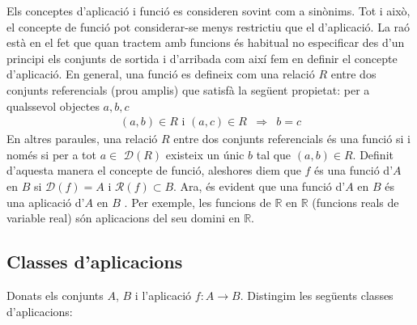 \begin{observacio}
Els conceptes d'aplicació i funció es consideren sovint com a sinònims. Tot i això, el concepte de funció pot considerar-se menys
restrictiu que el d'aplicació. La raó està en el fet que quan
tractem amb funcions és habitual no especificar des d'un principi els
conjunts de sortida i d'arribada com així fem en definir el concepte
d'aplicació. En general, una funció es defineix com una relació
$R$ entre dos conjunts referencials (prou amplis) que satisfà la següent propietat: per a qualssevol objectes $a,b,c$%
\begin{equation*}
\begin{array}{ccc}
(a,b)\in R\text{ i }(a,c)\in R & \Longrightarrow & b=c%
\end{array}
\end{equation*}
En altres paraules, una relació $R$ entre dos conjunts referencials és una funció si i només si per a tot $a\in$ $\mathcal{D}(R)$
existeix un únic $b$ tal que $(a,b)\in R$. Definit d'aquesta manera el
concepte de funció, aleshores diem que $f$ és una funció d'$A$
en $B$ si $\mathcal{D}(f)=A$ i $\mathcal{R}(f)\subset B$. Ara, és
evident que una funció d'$A$ en $B$ és una aplicació d'$A$ en $B$%
. Per exemple, les funcions de $\mathbb{R}$ en $\mathbb{R}$ (funcions reals
de variable real) són aplicacions del seu domini en $\mathbb{R}$.
\end{observacio}

\subsection{Classes d'aplicacions}

Donats els conjunts $A$, $B$ i l'aplicació $f:A\longrightarrow B$.
Distingim les següents classes d'aplicacions:

